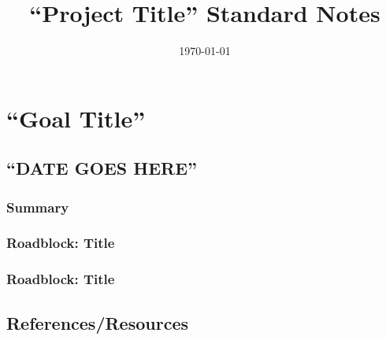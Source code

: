 \documentclass[a4paper, 10pt]{article}
\title{``Project Title'' Standard Notes}
\date{\today}
\begin{document}
\maketitle

\pagebreak

\tableofcontents

\pagebreak


\section{``Goal Title''}


	\subsection{``DATE GOES HERE''}
		\subsubsection*{Summary}
	
		\subsubsection{Roadblock: Title}

		\subsubsection{Roadblock: Title}

	\subsection{References/Resources}
\end{document}
